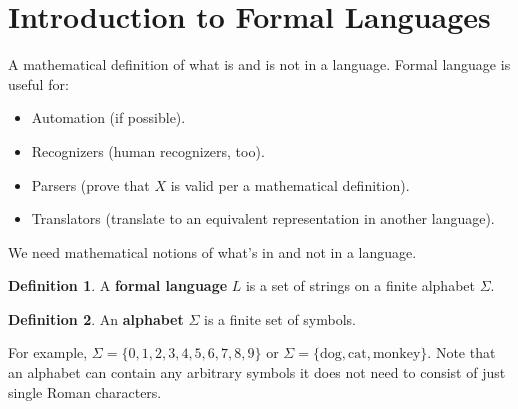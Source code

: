 \documentclass[]{article}
\theoremstyle{definition}
\newtheorem*{defn}{Definition}
\newcommand{\lecture}[1]{\marginpar{{\footnotesize $\leftarrow$ \underline{#1}}}}
\begin{document}
	\section{Introduction to Formal Languages}
		A mathematical definition of what is and is not in a language. Formal language is useful for:
		\begin{itemize}
			\item Automation (if possible).
			\item Recognizers (human recognizers, too).
			\item Parsers (prove that $X$ is valid per a mathematical definition).
			\item Translators (translate to an equivalent representation in another language).
		\end{itemize}

		\lecture{February 4, 2013}
		We need mathematical notions of what's in and not in a language.

		\begin{defn}
		A \textbf{formal language} $L$ is a set of strings on a finite alphabet $\Sigma$.
		\end{defn}

		\begin{defn}
			An \textbf{alphabet} $\Sigma$ is a finite set of symbols.
		\end{defn}
		For example, $\Sigma = \{0, 1, 2, 3, 4, 5, 6, 7, 8, 9\}$ or $\Sigma = \{ \text{dog}, \text{cat}, \text{monkey} \}$. Note that an alphabet can contain any arbitrary symbols \textendash{} it does not need to consist of just single Roman characters.
\end{document}
